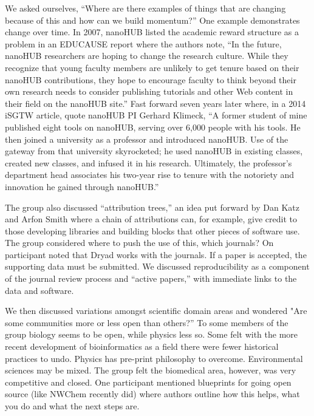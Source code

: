 \documentclass[11pt, oneside]{amsart}
\begin{document}
We asked ourselves, ``Where are there examples of things that are changing
because of this and how can we build momentum?'' One example demonstrates
change over time. In 2007, nanoHUB listed the academic reward structure as
a problem in an EDUCAUSE report where the authors note, ``In the future,
nanoHUB researchers are hoping to change the research culture. While they
recognize that young faculty members are unlikely to get tenure based on
their nanoHUB contributions, they hope to encourage faculty to think
beyond their own research needs to consider publishing tutorials and other
Web content in their field on the nanoHUB site.'' Fast forward seven years
later where, in a 2014 iSGTW article, quote nanoHUB PI Gerhard Klimeck, ``A
former student of mine published eight tools on nanoHUB, serving over
6,000 people with his tools. He then joined a university as a professor
and introduced nanoHUB. Use of the gateway from that university
skyrocketed; he used nanoHUB in existing classes, created new classes, and
infused it in his research. Ultimately, the professor's department head
associates his two-year rise to tenure with the notoriety and innovation
he gained through nanoHUB.''

The group also discussed ``attribution trees,'' an idea put forward by Dan
Katz and Arfon Smith where a chain of attributions can, for example, give
credit to those developing libraries and building blocks that other pieces
of software use. The group considered where to push the use of this, which
journals? On participant noted that Dryad works with the journals. If a
paper is accepted, the supporting data must be submitted. We discussed
reproducibility as a component of the journal review process and ``active
papers,'' with immediate links to the data and software.

We then discussed variations amongst scientific domain areas and wondered
"Are some communities more or less open than others?'' To some members of
the group biology seems to be open, while physics less so. Some felt with
the more recent development of bioinformatics as a field there were fewer
historical practices to undo. Physics has pre-print philosophy to
overcome. Environmental sciences may be mixed. The group felt the
biomedical area, however, was very competitive and closed. One participant
mentioned blueprints for going open source (like NWChem recently did)
where authors outline how this helps, what you do and what the next steps
are.
\end{document}
